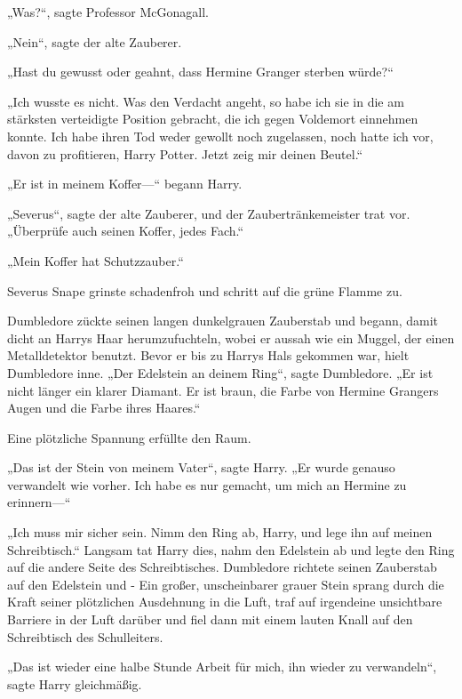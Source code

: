 {„Was?“, sagte Professor McGonagall.

„Nein“, sagte der alte Zauberer.

„Hast du gewusst oder geahnt, dass Hermine Granger sterben würde?“

„Ich wusste es nicht. Was den Verdacht angeht, so habe ich sie in die am stärksten verteidigte Position gebracht, die ich gegen Voldemort einnehmen konnte. Ich habe ihren Tod weder gewollt noch zugelassen, noch hatte ich vor, davon zu profitieren, Harry Potter. Jetzt zeig mir deinen Beutel.“

„Er ist in meinem Koffer—“ begann Harry.

„Severus“, sagte der alte Zauberer, und der Zaubertränkemeister trat vor. „Überprüfe auch seinen Koffer, jedes Fach.“

„Mein Koffer hat Schutzzauber.“

Severus Snape grinste schadenfroh und schritt auf die grüne Flamme zu.

Dumbledore zückte seinen langen dunkelgrauen Zauberstab und begann, damit dicht an Harrys Haar herumzufuchteln, wobei er aussah wie ein Muggel, der einen Metalldetektor benutzt. Bevor er bis zu Harrys Hals gekommen war, hielt Dumbledore inne. „Der Edelstein an deinem Ring“, sagte Dumbledore. „Er ist nicht länger ein klarer Diamant. Er ist braun, die Farbe von Hermine Grangers Augen und die Farbe ihres Haares.“

Eine plötzliche Spannung erfüllte den Raum.

„Das ist der Stein von meinem Vater“, sagte Harry. „Er wurde genauso verwandelt wie vorher. Ich habe es nur gemacht, um mich an Hermine zu erinnern—“

„Ich muss mir sicher sein. Nimm den Ring ab, Harry, und lege ihn auf meinen Schreibtisch.“ Langsam tat Harry dies, nahm den Edelstein ab und legte den Ring auf die andere Seite des Schreibtisches. Dumbledore richtete seinen Zauberstab auf den Edelstein und - Ein großer, unscheinbarer grauer Stein sprang durch die Kraft seiner plötzlichen Ausdehnung in die Luft, traf auf irgendeine unsichtbare Barriere in der Luft darüber und fiel dann mit einem lauten Knall auf den Schreibtisch des Schulleiters.

„Das ist wieder eine halbe Stunde Arbeit für mich, ihn wieder zu verwandeln“, sagte Harry gleichmäßig.

}
